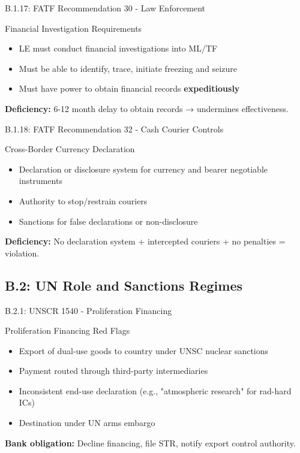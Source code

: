\documentclass{beamer}
\begin{document}
	\begin{frame}{B.1.17: FATF Recommendation 30 - Law Enforcement}
		\begin{block}{Financial Investigation Requirements}
			\begin{itemize}
				\item LE must conduct financial investigations into ML/TF
				\item Must be able to identify, trace, initiate freezing and seizure
				\item Must have power to obtain financial records \textbf{expeditiously}
			\end{itemize}
		\end{block}
		\textbf{Deficiency:} 6-12 month delay to obtain records → undermines effectiveness.
	\end{frame}
	
	\begin{frame}{B.1.18: FATF Recommendation 32 - Cash Courier Controls}
		\begin{block}{Cross-Border Currency Declaration}
			\begin{itemize}
				\item Declaration or disclosure system for currency and bearer negotiable instruments
				\item Authority to stop/restrain couriers
				\item Sanctions for false declarations or non-disclosure
			\end{itemize}
		\end{block}
		\textbf{Deficiency:} No declaration system + intercepted couriers + no penalties = violation.
	\end{frame}
	
	\subsection{B.2: UN Role and Sanctions Regimes}
	
	\begin{frame}{B.2.1: UNSCR 1540 - Proliferation Financing}
		\begin{block}{Proliferation Financing Red Flags}
			\begin{itemize}
				\item Export of dual-use goods to country under UNSC nuclear sanctions
				\item Payment routed through third-party intermediaries
				\item Inconsistent end-use declaration (e.g., "atmospheric research" for rad-hard ICs)
				\item Destination under UN arms embargo
			\end{itemize}
		\end{block}
		\textbf{Bank obligation:} Decline financing, file STR, notify export control authority.
	\end{frame}
	
\end{document}
